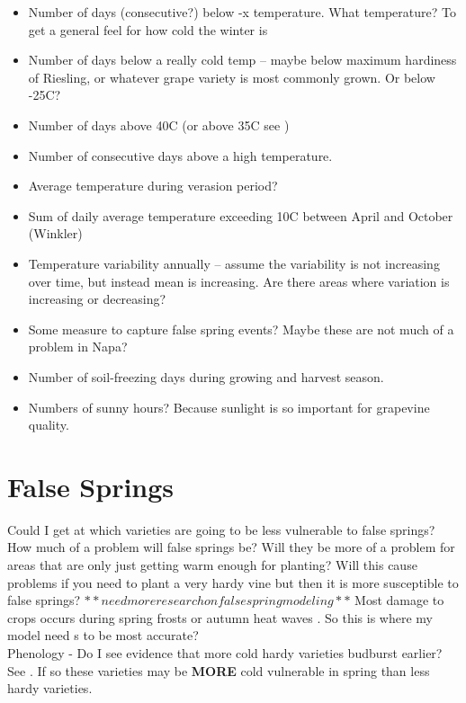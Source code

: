 \documentclass[11pt,letter]{article}
\begin{document}
\begin{itemize} 
\item Number of days (consecutive?) below -x temperature. What temperature? To get a general feel for how cold the winter is
\item Number of days below a really cold temp – maybe below maximum hardiness of Riesling, or whatever grape variety is most commonly grown. Or below -25\textdegree C?
\item Number of days above 40\textdegree C (or above 35\textdegree C see \cite{Blanco-Ward2017})
\item Number of consecutive days above a high temperature.
\item Average temperature during verasion period? 
\item Sum of daily average temperature  exceeding 10\textdegree C between April and October (Winkler)
\item Temperature variability annually – assume the variability is not increasing over time, but instead mean is increasing. Are there areas where variation is increasing or decreasing?
\item Some measure to capture false spring events? Maybe these are not much of a problem in Napa? 
\item Number of soil-freezing days during growing and harvest season.
\item Numbers of sunny hours? Because sunlight is so important for grapevine quality. 
\end{itemize}

\section{False Springs} 
Could I get at which varieties are going to be less vulnerable to false springs? \\

How much of a problem will false springs be? Will they be more of a problem for areas that are only just getting warm enough for planting? Will this cause problems if you need to plant a very hardy vine but then it is more susceptible to false springs? $**need more research on false spring modeling**$
Most damage to crops occurs during spring frosts or autumn heat waves \citep{Charrier2013}. So this is where my model need s to be most accurate? \\

Phenology - Do I see evidence that more cold hardy varieties budburst earlier? See \cite{Ferguson2014}. If so these varieties may be \textbf{MORE} cold vulnerable in spring than less hardy varieties. \\ 
\end{document}
